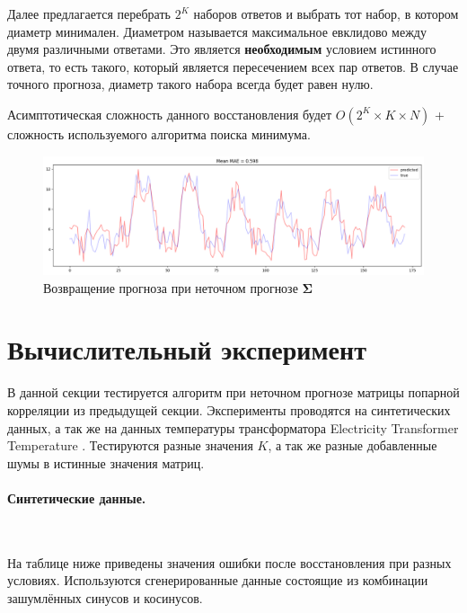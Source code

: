 \documentclass{article}
\begin{document}
Далее предлагается перебрать $2^K$ наборов ответов и выбрать тот набор, в котором диаметр минимален. Диаметром называется максимальное евклидово между двумя различными ответами. Это является \textbf{необходимым} условием истинного ответа, то есть такого, который является пересечением всех пар ответов. В случае точного прогноза, диаметр такого набора всегда будет равен нулю.

Асимптотическая сложность данного восстановления будет $O(2^K \times K \times N)$ + сложность используемого алгоритма поиска минимума.

\begin{figure}[H]
	\centering
	\includegraphics[width=\textwidth]{TbiLSTM.png}
	\caption{Возвращение прогноза при неточном прогнозе $\mathbf{\Sigma}$}
	\label{fig:fig4}
\end{figure}

\section{Вычислительный эксперимент}

В данной секции тестируется алгоритм при неточном прогнозе матрицы попарной корреляции из предыдущей секции. Эксперименты проводятся на синтетических данных, а так же на данных температуры трансформатора Electricity Transformer Temperature \cite{zhou2021informer}. Тестируются разные значения $K$, а так же разные добавленные шумы в истинные значения матриц.

\paragraph{Синтетические данные.}\

На таблице ниже приведены значения ошибки после восстановления при разных условиях. Используются сгенерированные данные состоящие из комбинации зашумлённых синусов и косинусов.
\end{document}
